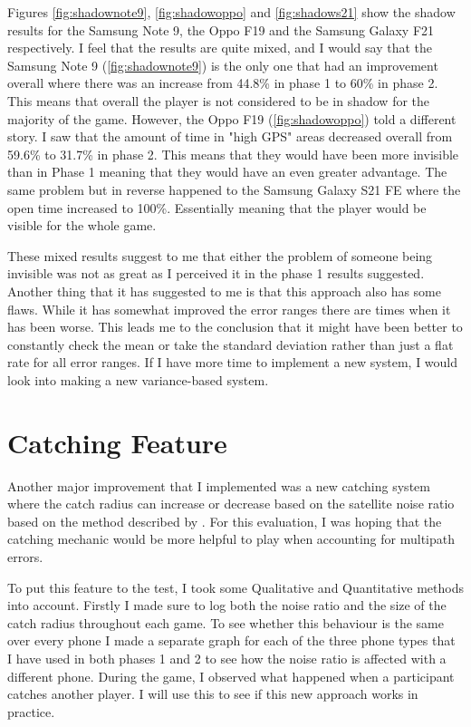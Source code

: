 \documentclass{l4proj}
\begin{document}
Figures \ref{fig:shadownote9}, \ref{fig:shadowoppo} and \ref{fig:shadows21} show the shadow results for the Samsung Note 9,
the Oppo F19 and the Samsung Galaxy F21 respectively. I feel that the results are quite mixed, and I would say that the
Samsung Note 9 (\ref{fig:shadownote9}) is the only one that had an improvement overall where there was an increase from
44.8\% in phase 1 to 60\% in phase 2. This means that overall the player is not considered to be in shadow for the majority
of the game. However, the Oppo F19 (\ref{fig:shadowoppo}) told a different story. I saw that the amount
of time in "high GPS" areas decreased overall from 59.6\% to 31.7\% in phase 2. This means that they would have been more
invisible than in Phase 1 meaning that they would have an even greater advantage. The same problem but in reverse happened
to the Samsung Galaxy S21 FE where the open time increased to 100\%. Essentially meaning that the player would be visible
for the whole game.

These mixed results suggest to me that either the problem of someone being invisible was not as great as I perceived it in
the phase 1 results suggested. Another thing that it has suggested to me is that this approach also has some flaws. While
it has somewhat improved the error ranges there are times when it has been worse. This leads me to the conclusion that it might
have been better to constantly check the mean or take the standard deviation rather than just a flat rate for all error ranges.
If I have more time to implement a new system, I would look into making a new variance-based system.

\section{Catching Feature}
\label{phase2catcheval}
Another major improvement that I implemented was a new catching system where the catch radius can increase or decrease based
on the satellite noise ratio based on the method described by \cite{uberGPS}. For this evaluation, I was hoping that the catching mechanic would be more helpful to play when
accounting for multipath errors.

To put this feature to the test, I took some Qualitative and Quantitative methods into account. Firstly I made sure to log both
the noise ratio and the size of the catch radius throughout each game. To see whether this behaviour is the same over every phone
I made a separate graph for each of the three phone types that I have used in both phases 1 and 2 to see how the noise ratio is affected
with a different phone. During the game, I observed what happened when a participant catches another player. I will use this to see if
this new approach works in practice.
\end{document}

